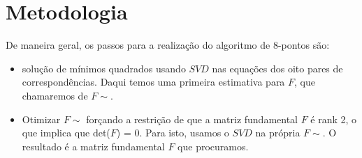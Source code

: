 \documentclass[conference]{IEEEtran}
\begin{document}
\section{Metodologia} 
\label{sec:meth} 
     De maneira geral, os passos para a realiza\c{c}\~ao do algoritmo de 8-pontos s\~ao:
\begin{itemize}
  \item solu\c{c}\~ao de m\'inimos quadrados usando $SVD$ nas equa\c{c}\~oes dos oito pares de correspond\^encias. Daqui temos 
  uma primeira estimativa para $F$, que chamaremos de $F\sim$.
  \item Otimizar $F\sim$ for\c{c}ando a restri\c{c}\~ao de que a matriz fundamental $F$ \'e rank 2, o que implica 
  que det($F$) = 0. Para isto, usamos o $SVD$ na pr\'opria $F\sim$. O resultado \'e a matriz fundamental $F$ que procuramos.\\
\end{itemize}
\end{document}
